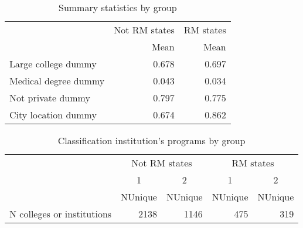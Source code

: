 \documentclass[
  landscape]{article}
\begin{document}
\text{ }
\begin{table}

\caption{\label{tab:unnamed-chunk-3}Summary statistics by group}
\centering
\begin{tabular}[t]{lrr}
\toprule
\multicolumn{1}{c}{ } & \multicolumn{1}{c}{Not RM states} & \multicolumn{1}{c}{RM states} \\
\cmidrule(l{3pt}r{3pt}){2-2} \cmidrule(l{3pt}r{3pt}){3-3}
  & Mean & Mean \\
\midrule
Large college dummy & \num{0.678} & \num{0.697}\\
Medical degree dummy & \num{0.043} & \num{0.034}\\
Not private dummy & \num{0.797} & \num{0.775}\\
City location dummy & \num{0.674} & \num{0.862}\\
\bottomrule
\end{tabular}
\end{table}

\text{ }
\begin{table}

\caption{\label{tab:unnamed-chunk-3}Classification institution’s programs by group}
\centering
\begin{tabular}[t]{lrrrr}
\toprule
\multicolumn{1}{c}{ } & \multicolumn{2}{c}{Not RM states} & \multicolumn{2}{c}{RM states} \\
\cmidrule(l{3pt}r{3pt}){2-3} \cmidrule(l{3pt}r{3pt}){4-5}
\multicolumn{1}{c}{ } & \multicolumn{1}{c}{1} & \multicolumn{1}{c}{2} & \multicolumn{1}{c}{1} & \multicolumn{1}{c}{2} \\
\cmidrule(l{3pt}r{3pt}){2-2} \cmidrule(l{3pt}r{3pt}){3-3} \cmidrule(l{3pt}r{3pt}){4-4} \cmidrule(l{3pt}r{3pt}){5-5}
  & NUnique & NUnique  & NUnique   & NUnique   \\
\midrule
N colleges or institutions & 2138 & 1146 & 475 & 319\\
\bottomrule
\end{tabular}
\end{table}
\end{document}
